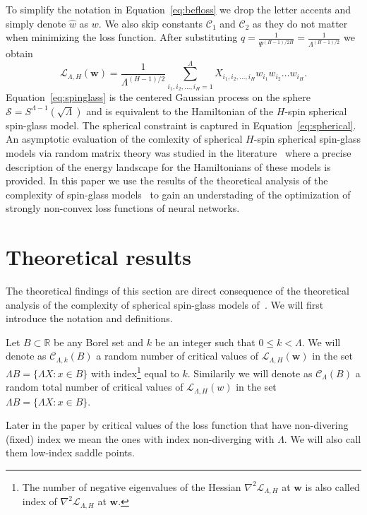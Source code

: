 \documentclass[twoside]{article}
\begin{document}
To simplify the notation in Equation~\ref{eq:befloss} we drop the letter accents and simply denote $\hat{w}$ as $w$. We also skip constants $\mathcal{C}_1$ and $\mathcal{C}_2$ as they do not matter when minimizing the loss function. After substituting $q = \frac{1}{\Psi^{(H-1)/2H}} = \frac{1}{\Lambda^{(H-1)/2}}$ we obtain
\begin{equation}
\mathcal{L}_{\!\Lambda,H}({\bm w}) \!=\! \frac{1}{\Lambda^{\!(H\!-\!1)/2}}\!\!\!\!\!\!\!\sum_{i_1,i_2,\dots,i_H=1}^{\Lambda}\!\!\!\!\!\!\!\!\!\!\!X_{i_1,i_2,\dots,i_H}\!w_{i_1}\!w_{i_2}\!\!\dots\!w_{i_H}.
\label{eq:spinglass}
\end{equation}
Equation~\ref{eq:spinglass} is the centered Gaussian process on the sphere $\mathcal{S} = S^{\Lambda-1}(\sqrt{\Lambda})$ and is equivalent to the Hamiltonian of the $H$-spin spherical spin-glass model. The spherical constraint is captured in Equation~\ref{eq:spherical}. An asymptotic evaluation of the comlexity of spherical $H$-spin spherical spin-glass models via random matrix theory was studied in the literature~\cite{AAC2010} where a precise description of the energy landscape for the Hamiltonians of these models is provided. In this paper we use the results of the theoretical analysis of the complexity of spin-glass models~\cite{AAC2010} to gain an understading of the optimization of strongly non-convex loss functions of neural networks. 

\section{Theoretical results}
\label{sec:theory}
The theoretical findings of this section are direct consequence of the theoretical analysis of the complexity of spherical spin-glass models of~\cite{AAC2010}. We will first introduce the notation and definitions. 
\begin{definition}
Let $B \subset \mathbb{R}$ be any Borel set and $k$ be an integer such that $0 \leq k < \Lambda$. We will denote as $\mathcal{C}_{\Lambda,k}(B)$ a random number of critical values of $\mathcal{L}_{\Lambda,H}({\bm w})$ in the set $\Lambda B = \{\Lambda X:x\in B\}$ with index\footnote{The number of negative eigenvalues of the Hessian $\nabla^2\mathcal{L}_{\Lambda,H}$ at ${\bm w}$ is also called index of $\nabla^2\mathcal{L}_{\Lambda,H}$ at ${\bm w}$.} equal to $k$. Similarily we will denote as $\mathcal{C}_{\Lambda}(B)$ a random total number of critical values of $\mathcal{L}_{\Lambda,H}(w)$ in the set $\Lambda B = \{\Lambda X:x\in B\}$.
\end{definition}
Later in the paper by critical values of the loss function that have non-divering (fixed) index we mean the ones with index non-diverging with $\Lambda$. We will also call them low-index saddle points.
\end{document}
